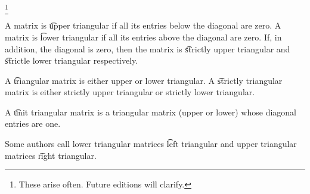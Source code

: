 
\footnote{These arise often. Future editions will clarify.}


A matrix is \t{upper triangular} if all its entries below the diagonal are zero.
A matrix is \t{lower triangular} if all its entries above the diagonal are zero.
If, in addition, the diagonal is zero, then the matrix is \t{strictly upper triangular} and \t{strictle lower triangular} respectively.

A \t{triangular} matrix is either upper or lower triangular.
A \t{strictly triangular} matrix is either strictly upper triangular or strictly lower triangular.

A \t{unit triangular matrix} is a triangular matrix (upper or lower) whose diagonal entries are one.


Some authors call lower triangular matrices \t{left triangular} and upper triangular matrices \t{right triangular}.

\blankpage
